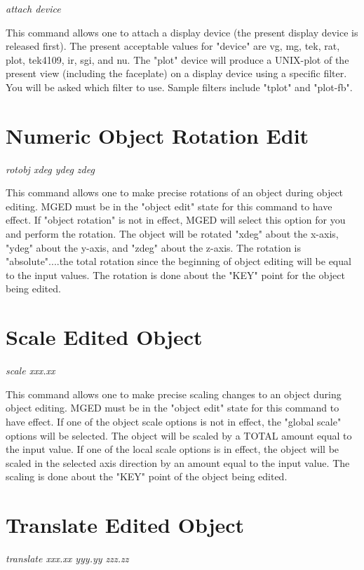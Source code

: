 {\em \center
attach device
}

This command allows one to attach a display device (the present display device
is released first).
The present acceptable values for "device" are vg, mg, tek, rat, plot, tek4109, ir, sgi, and nu.
The "plot" device will produce a UNIX-plot of the present view (including the
faceplate) on a display device using a specific filter.
You will be asked which filter to use.
Sample filters include "tplot" and "plot-fb".

\section{Numeric Object Rotation Edit}

{\em \center
rotobj xdeg ydeg zdeg
}

This command allows one to make precise rotations of an object during
object editing.
MGED must be in the "object edit" state for this command to have effect.
If "object rotation" is not in effect, MGED will select this option for you
and perform the rotation.
The object will be rotated "xdeg" about the x-axis, "ydeg" about the
y-axis, and "zdeg" about the z-axis.
The rotation is "absolute"....the total rotation since the beginning
of object editing will be equal to the input values.
The rotation is done about the "KEY" point for the object being edited.

\section{Scale Edited Object}

{\em \center
scale xxx.xx
}

This command allows one to make precise scaling changes to an object
during object editing.
MGED must be in the "object edit" state for this command to have effect.
If one of the object scale options is not in effect, the "global scale"
options will be selected.
The object will be scaled by a TOTAL amount equal to the input value.
If one of the local scale options is in effect, the object will be
scaled in the selected axis direction by an amount equal to the input value.
The scaling is done about the "KEY" point of the object being edited.

\section{Translate Edited Object}

{\em \center
translate xxx.xx yyy.yy zzz.zz
}

